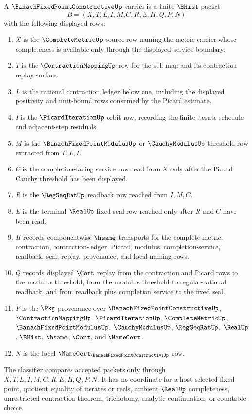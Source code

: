 \begin{definition}
\label{def:banach-fixed-point-constructive-carrier}
A $\BanachFixedPointConstructiveUp$ carrier is a finite $\BHist$ packet
$$
B=(X,T,L,I,M,C,R,E,H,Q,P,N)
$$
with the following displayed rows:
\begin{enumerate}
\item $X$ is the $\CompleteMetricUp$ source row naming the metric carrier whose completeness is available only through the displayed service boundary.
\item $T$ is the $\ContractionMappingUp$ row for the self-map and its contraction replay surface.
\item $L$ is the rational contraction ledger below one, including the displayed positivity and unit-bound rows consumed by the Picard estimate.
\item $I$ is the $\PicardIterationUp$ orbit row, recording the finite iterate schedule and adjacent-step residuals.
\item $M$ is the $\BanachFixedPointModulusUp$ or $\CauchyModulusUp$ threshold row extracted from $T,L,I$.
\item $C$ is the completion-facing service row read from $X$ only after the Picard Cauchy threshold has been displayed.
\item $R$ is the $\RegSeqRatUp$ readback row reached from $I,M,C$.
\item $E$ is the terminal $\RealUp$ fixed seal row reached only after $R$ and $C$ have been read.
\item $H$ records componentwise $\hsame$ transports for the complete-metric, contraction, contraction-ledger, Picard, modulus, completion-service, readback, seal, replay, provenance, and local naming rows.
\item $Q$ records displayed $\Cont$ replay from the contraction and Picard rows to the modulus threshold, from the modulus threshold to regular-rational readback, and from readback plus completion service to the fixed seal.
\item $P$ is the $\Pkg$ provenance over $\BanachFixedPointConstructiveUp$, $\ContractionMappingUp$, $\PicardIterationUp$, $\CompleteMetricUp$, $\BanachFixedPointModulusUp$, $\CauchyModulusUp$, $\RegSeqRatUp$, $\RealUp$, $\BHist$, $\hsame$, $\Cont$, and $\NameCert$.
\item $N$ is the local $\NameCert_{\BanachFixedPointConstructiveUp}$ row.
\end{enumerate}
The classifier compares accepted packets only through $X,T,L,I,M,C,R,E,H,Q,P,N$. It has no coordinate for a host-selected fixed point, quotient equality of iterates or reals, ambient $\RealUp$ completeness, unrestricted contraction theorem, trichotomy, analytic continuation, or countable choice.
\end{definition}

